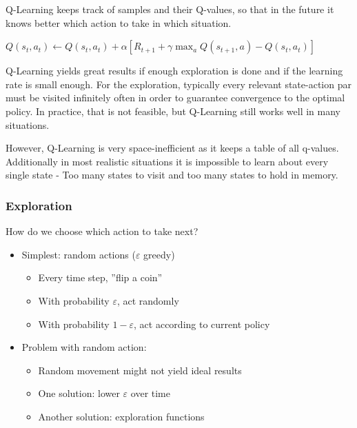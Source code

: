 \documentclass[
../EiKI_Summary.tex,
]
{subfiles}
\begin{document}
\begin{defbox}
    [Q-Learning]
    Q-Learning keeps track of samples and their Q-values, so that in the future it knows better which action to take in which situation.

    \begin{csmb*}
        $Q(s_t, a_t) \leftarrow Q(s_t, a_t) + \alpha [R_{t+1} + \gamma \max_a Q(s_{t+1}, a) - Q(s_t, a_t)]$
    \end{csmb*}

    Q-Learning yields great results if enough exploration is done and if the learning rate is small enough. For the exploration, typically every relevant state-action par must be visited infinitely often in order to guarantee convergence to the optimal policy. In practice, that is not feasible, but Q-Learning still works well in many situations.

    However, Q-Learning is very space-inefficient as it keeps a table of all q-values. Additionally in most realistic situations it is impossible to learn about every single state - Too many states to visit and too many states to hold in memory.
\end{defbox}

\subsubsection{Exploration}
How do we choose which action to take next?
\begin{itemize}
    \item Simplest: random actions ($\varepsilon$ greedy)
    \begin{itemize}
        \item Every time step, ''flip a coin''
        \item With probability $\varepsilon$, act randomly
        \item With probability $1-\varepsilon$, act according to current policy
    \end{itemize}
    \item Problem with random action:
    \begin{itemize}
        \item Random movement might not yield ideal results
        \item One solution: lower $\varepsilon$ over time
        \item Another solution: exploration functions
    \end{itemize}
\end{itemize}
\end{document}
